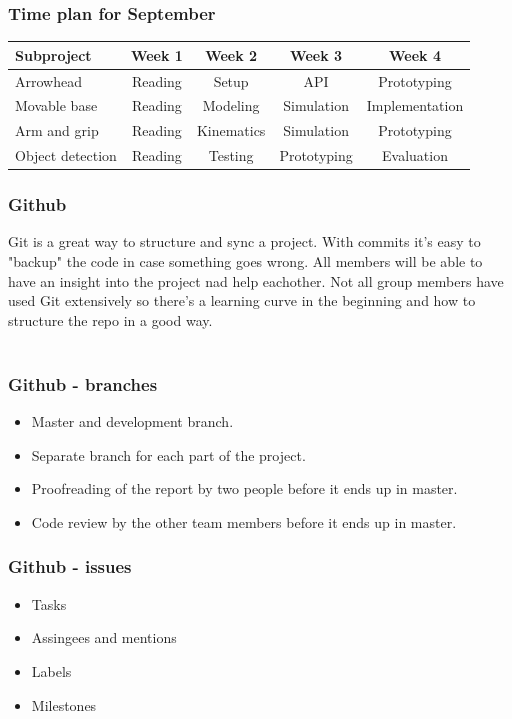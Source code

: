 \documentclass{beamer}
\begin{document}
\begin{frame}
    \frametitle{Time plan for September}
    \begin{table}
        \begin{tabular}{l | c | c | c | c }
        Subproject & Week 1 & Week 2 & Week 3 & Week 4 \\
        \hline \hline
            Arrowhead & Reading& Setup & API & Prototyping\\
            Movable base & Reading& Modeling & Simulation & Implementation\\
            Arm and grip  & Reading & Kinematics & Simulation& Prototyping\\
            Object detection & Reading & Testing & Prototyping & Evaluation\\
        \end{tabular}
    \end{table}
\end{frame}

\begin{frame}
    \frametitle{Github}
    Git is a great way to structure and sync a project. With commits it's easy to 
    "backup" the code in case something goes wrong. All members will be able to 
    have an insight into the project nad help eachother. Not all group members
    have used Git extensively so there's a learning curve in the beginning and how 
    to structure the repo in a good way. 
    \\~\
\end{frame}

\begin{frame}
    \frametitle{Github - branches}
    \begin{itemize}
        \item Master and development branch.
        \item Separate branch for each part of the project.
        \item Proofreading of the report by two people before it ends up in master.
        \item Code review by the other team members before it ends up in master. 
    \end{itemize}  
\end{frame}

\begin{frame}
    \frametitle{Github - issues}
    \begin{itemize}
        \item Tasks
        \item Assingees and mentions
        \item Labels
        \item Milestones
    \end{itemize}  
\end{frame}
\end{document}
